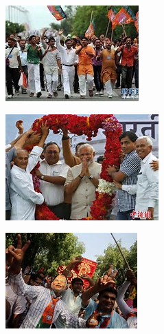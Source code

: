 \begin{figure}[!ht]
	\centering
    \begin{subfigure}{0.32\columnwidth}
        \centering
        \includegraphics[width=\columnwidth]{yindu1.jpg}
    \end{subfigure}
    \begin{subfigure}{0.32\columnwidth}
        \centering
        \includegraphics[width=\columnwidth]{yindu2.jpg}
    \end{subfigure}
	\begin{subfigure}{0.32\columnwidth}
        \centering
        \includegraphics[width=\columnwidth]{yindu3.jpg}

\end{subfigure}
\end{figure}
